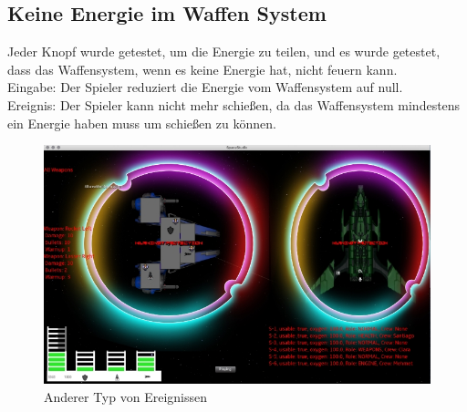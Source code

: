 \documentclass[12pt]{article}
\begin{document}
\subsection{Keine Energie im Waffen System}
Jeder Knopf wurde getestet, um die Energie zu teilen, und es wurde getestet, dass das Waffensystem, wenn es keine Energie hat, nicht feuern kann.\\
Eingabe: Der Spieler reduziert die Energie vom Waffensystem auf null.\\
Ereignis: Der Spieler kann nicht mehr schießen, da das Waffensystem mindestens ein Energie haben muss um schießen zu können.\\
\begin{figure}[htp]
\centering
\includegraphics[scale=0.7]{TestProtocolBilder/OptimizedEnergieVerteilung.png}
\caption{Anderer Typ von Ereignissen}
\end{figure}

\newpage
\end{document}
